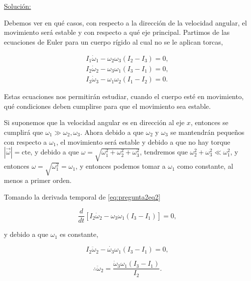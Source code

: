 \documentclass[a4paper,10pt]{article}
\numberwithin{equation}{section}
\begin{document}
\vspace{.3cm}

\underline{Solución:} \vspace{.3cm} 

Debemos ver en qué casos, con respecto a la dirección de la velocidad angular, el 
movimiento será estable y con respecto a qué eje principal. Partimos de las ecuaciones 
de Euler para un cuerpo rígido al cual no se le aplican torcas,

\begin{align}
 \label{eq:pregunta2eq1}
 I_1\dot{\omega}_1 - \omega_2\omega_3(I_2 - I_3) = 0, \\
 \label{eq:pregunta2eq2}
 I_2\dot{\omega}_2 - \omega_3\omega_1(I_3 - I_1) = 0, \\
 \label{eq:pregunta2eq3}
 I_3\dot{\omega}_3 - \omega_1\omega_2(I_1 - I_2) = 0.
\end{align}

Estas ecuaciones nos permitirán estudiar, cuando el cuerpo esté en movimiento, qué 
condiciones deben cumplirse para que el movimiento sea estable.

\vspace{.3cm}

Si suponemos que la velocidad angular es en dirección al eje $x$, entonces se 
cumplirá que $\omega_1 \gg \omega_2,\omega_3$. Ahora debido a que $\omega_2$ y 
$\omega_3$ se mantendrán pequeños con respecto a $\omega_1$, el movimiento será 
estable y debido a que no hay torque $|\overrightarrow{\omega}| = \text{cte}$, y 
debido a que $\omega = \sqrt{\omega_1^2 + \omega_2^2 + \omega_3^2}$, tendremos que 
$\omega_2^2 + \omega_3^2 \ll \omega_1^2$, y entonces $\omega = \sqrt{\omega_1^2} = 
\omega_1$, y entonces podemos tomar a $\omega_1$ como constante, al menos 
a primer orden.

Tomando la derivada temporal de \eqref{eq:pregunta2eq2} 

\begin{equation}
 \frac{d}{dt}\left[I_2\dot{\omega}_2 - \omega_3\omega_1(I_3 - I_1) \right] = 0,
\end{equation}

y debido a que $\omega_1$ es constante, 

\begin{equation}
 I_2\ddot{\omega}_2 - \dot{\omega_3}\omega_1(I_3 - I_1) = 0,
\end{equation}

\begin{equation}
 \therefore \ddot{\omega}_2 = \frac{\dot{\omega}_3\omega_1(I_3-I_1)}{I_2}.
  \label{eq:pregunta2eq4}
\end{equation}
\end{document}
